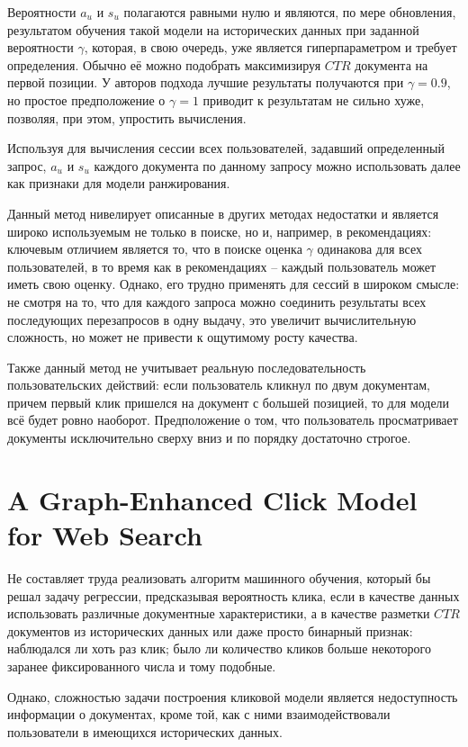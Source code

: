\documentclass[diploma]{nanolab2015}
\begin{document}
Вероятности $a_u$ и $s_u$ полагаются равными нулю и являются, по мере обновления, результатом обучения такой модели на исторических данных при заданной вероятности $\gamma$, которая, в свою очередь, уже является гиперпараметром и требует определения. Обычно её можно подобрать максимизируя $CTR$ документа на первой позиции. У авторов подхода лучшие результаты получаются при $\gamma = 0.9$, но простое предположение о $\gamma = 1$ приводит к результатам не сильно хуже, позволяя, при этом, упростить вычисления.

Используя для вычисления сессии всех пользователей, задавший определенный запрос, $a_u$ и $s_u$ каждого документа по данному запросу можно использовать далее как признаки для модели ранжирования.

Данный метод нивелирует описанные в других методах недостатки и является широко используемым не только в поиске, но и, например, в рекомендациях: ключевым отличием является то, что в поиске оценка $\gamma$ одинакова для всех пользователей, в то время как в рекомендациях -- каждый пользователь может иметь свою оценку. Однако, его трудно применять для сессий в широком смысле: не смотря на то, что для каждого запроса можно соединить результаты всех последующих перезапросов в одну выдачу, это увеличит вычислительную сложность, но может не привести к ощутимому росту качества.

Также данный метод не учитывает реальную последовательность пользовательских действий: если пользователь кликнул по двум документам, причем первый клик пришелся на документ с большей позицией, то для модели всё будет ровно наоборот. Предположение о том, что пользователь просматривает документы исключительно сверху вниз и по порядку достаточно строгое.

\section{A Graph-Enhanced Click Model for Web Search}
Не составляет труда реализовать алгоритм машинного обучения, который бы решал задачу регрессии, предсказывая вероятность клика, если в качестве данных использовать различные документные характеристики, а в качестве разметки $CTR$ документов из исторических данных или даже просто бинарный признак: наблюдался ли хоть раз клик; было ли количество кликов больше некоторого заранее фиксированного числа и тому подобные.

Однако, сложностью задачи построения кликовой модели является недоступность информации о документах, кроме той, как с ними взаимодействовали пользователи в имеющихся исторических данных.
\end{document}
